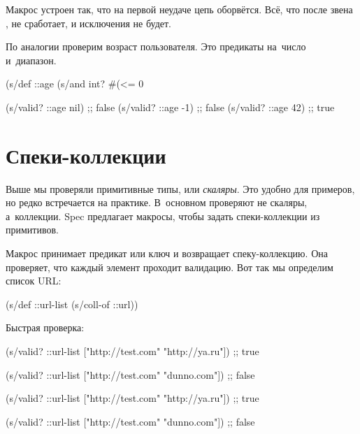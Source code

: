 \fi


Макрос  устроен так, что на первой неудаче цепь оборвётся. Всё, что
после звена , не сработает, и исключения не будет.

По аналогии проверим возраст пользователя. Это предикаты на~число и~диапазон.


\begin{clojure}
(s/def ::age
  (s/and int? #(<= 0 %

(s/valid? ::age nil) ;; false
(s/valid? ::age -1)  ;; false
(s/valid? ::age 42)  ;; true
\end{clojure}


\section{Спеки-коллекции}


Выше мы проверяли примитивные типы, или \emph{скаляры}. Это удобно для примеров,
но редко встречается на практике. В~основном проверяют не скаляры,
а~коллекции. Spec предлагает макросы, чтобы задать спеки-коллекции из
примитивов.


Макрос  принимает предикат или ключ и возвращает
спеку-коллекцию. Она проверяет, что каждый элемент проходит валидацию. Вот так
мы определим список URL:


\begin{clojure}
(s/def ::url-list (s/coll-of ::url))
\end{clojure}


\noindent
Быстрая проверка:

\ifnarrow


\begin{clojure}
(s/valid? ::url-list
  ["http://test.com" "http://ya.ru"])
;; true

(s/valid? ::url-list
  ["http://test.com" "dunno.com"])
;; false
\end{clojure}


\else


\begin{clojure}
(s/valid? ::url-list ["http://test.com" "http://ya.ru"])
;; true

(s/valid? ::url-list ["http://test.com" "dunno.com"])
;; false
\end{clojure}


\fi

